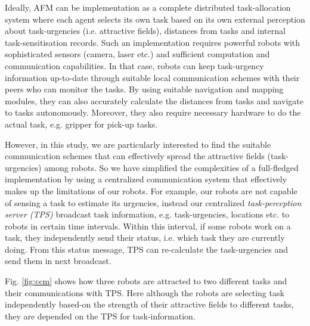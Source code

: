 \documentclass[final,5p,times,twocolumn]{elsarticle}
\begin{document}
Ideally, AFM can be implementation as a complete distributed task-allocation system where each agent selects its own task based on its own external perception about task-urgencies (i.e. attractive fields),  distances from tasks and internal task-sensitisation records. Such an implementation requires powerful robots with sophisticated sensors (camera, laser etc.) and sufficient computation and communication  capabilities. In that case, robots can keep  task-urgency information up-to-date  through suitable local communication  schemes with their peers who can monitor the tasks. By using suitable navigation and mapping modules, they can also accurately calculate the distances from tasks and navigate to tasks autonomously. Moreover, they also require necessary hardware to do the actual task, e.g. gripper for pick-up tasks.

However, in this study, we are particularly interested to find the suitable communication schemes that can effectively spread the attractive fields (task-urgencies) among robots. So we have simplified the complexities of a full-fledged implementation by using a centralized communication system  that effectively makes up the limitations of our robots.  For example, our robots are not  capable of sensing a task to estimate its urgencies, instead our centralized {\em task-perception server (TPS)} broadcast task information, e.g. task-urgencies, locations etc. to robots in certain time intervals. Within this interval, if some robots work on a task, they independently send their status, i.e. which task they are currently doing. From this status message,  TPS can re-calculate the task-urgencies and send them in next broadcast. 

Fig. \ref{fig:ccm} shows how three robots are attracted to two different tasks and their communications with TPS. Here although the robots are selecting task independently based-on the strength of their attractive fields to different tasks, they are depended on the TPS for task-information.
\end{document}

